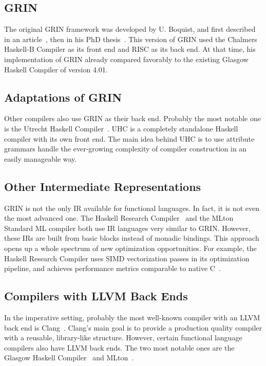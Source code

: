 \documentclass[main.tex]{subfiles}
\begin{document}
	
	\subsection{GRIN}
	
	
	The original GRIN framework was developed by U. Boquist, and first described in an article~\cite{boquist-grin}, then in his PhD thesis~\cite{boquist-phd}. This version of GRIN used the Chalmers Haskell-B Compiler as its front end and RISC as its back end. At that time, his implementation of GRIN already compared favorably to the existing Glasgow Haskell Compiler of version 4.01.
	
	\subsection{Adaptations of GRIN}
	
	Other compilers also use GRIN as their back end. Probably the most notable one is the Utrecht Haskell Compiler~\cite{uhc}. UHC is a completely standalone Haskell compiler with its own front end. The main idea behind UHC is to use attribute grammars handle the ever-growing complexity of compiler construction in an easily manageable way.
	
	\subsection{Other Intermediate Representations}
	
	GRIN is not the only IR available for functional languages. In fact, it is not even the most advanced one. The Haskell Research Compiler~\cite{hrc} and the MLton~\cite{mlton} Standard ML compiler both use IR languages very similar to GRIN. However, these IRs are built from basic blocks instead of monadic bindings. This approach opens up a whole spectrum of new optimization opportunities. For example, the Haskell Research Compiler uses SIMD vectorization passes in its optimization pipeline, and achieves performance metrics comparable to native C~\cite{haskell-gap}.
	
	\subsection{Compilers with LLVM Back Ends}
	
	In the imperative setting, probably the most well-known compiler with an LLVM back end is Clang~\cite{clang}. Clang's main goal is to provide a production quality compiler with a reusable, library-like structure. However, certain functional language compilers also have LLVM back ends. The two most notable ones are the Glasgow Haskell Compiler~\cite{ghc} and MLton~\cite{mlton-llvm}.
	
\end{document}
